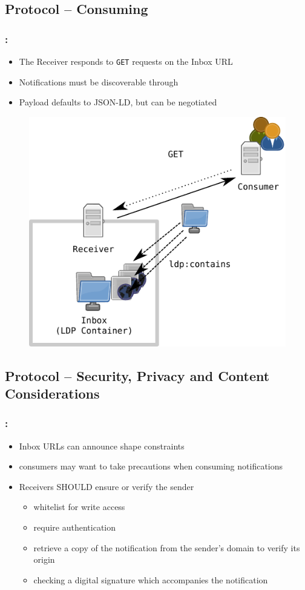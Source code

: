 \documentclass[aspectratio=169,hideallsubsections]{beamer}
\begin{document}
\subsection{Protocol – Consuming}
\begin{frame}
  \frametitle{\insertsection: \insertsubsection}%

  \begin{itemize}
   \item The Receiver responds to \texttt{GET} requests on the Inbox URL
   \item Notifications must be discoverable through 
   \item Payload defaults to JSON-LD, but can be negotiated
  \end{itemize}

  
    \begin{figure}
     \begin{center}
     \includegraphics[width=.3\textwidth]{LingedDataNotifications/LDN-overview-consuming}
     \end{center}
    \end{figure}

\end{frame}


\subsection{Protocol – Security, Privacy and Content Considerations}
\begin{frame}
  \frametitle{\insertsection: \insertsubsection}%

  \begin{itemize}
   \item Inbox URLs can announce shape constraints
   \item consumers may want to take precautions when consuming notifications
   \item Receivers SHOULD ensure or verify the sender
   \begin{itemize}
    \item whitelist for write access
    \item require authentication
    \item retrieve a copy of the notification from the sender's domain to verify its origin
    \item checking a digital signature which accompanies the notification
   \end{itemize}

  \end{itemize}

\end{frame}
\end{document}
